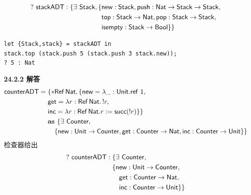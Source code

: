 \begin{taplauthorsolutionentrybox}
\[\begin{aligned}
?\ \mathsf{stackADT}:\{\exists\ \mathsf{Stack},
\{&\mathsf{new}:\mathsf{Stack},
\mathsf{push}:\mathsf{Nat}\to\mathsf{Stack}\to\mathsf{Stack},\\
&\mathsf{top}:\mathsf{Stack}\to\mathsf{Nat},
\mathsf{pop}:\mathsf{Stack}\to\mathsf{Stack},\\
&\mathsf{isempty}:\mathsf{Stack}\to\mathsf{Bool}\}\}
\end{aligned}
\]
\begin{lstlisting}
let {Stack,stack} = stackADT in
stack.top (stack.push 5 (stack.push 3 stack.new));
? 5 : Nat
\end{lstlisting}
\end{taplauthorsolutionentrybox}

\begin{taplauthorsolutionentrybox}
\label{sol:author:24.2.2}
\textbf{24.2.2 解答}
\[
\begin{aligned}
\mathsf{counterADT}={}&
\{*\mathsf{Ref}\,\mathsf{Nat},
\{\mathsf{new}=\lambda\_:\mathsf{Unit}.\mathsf{ref}\ 1,\\
&\mathsf{get}=\lambda r:\mathsf{Ref}\,\mathsf{Nat}.\,!r,\\
&\mathsf{inc}=\lambda r:\mathsf{Ref}\,\mathsf{Nat}.
  r:=\mathsf{succ}(!r)\}\}\\
&\textbf{as }\{\exists\ \mathsf{Counter},\\
&\quad\{\mathsf{new}:\mathsf{Unit}\to\mathsf{Counter},
\mathsf{get}:\mathsf{Counter}\to\mathsf{Nat},
\mathsf{inc}:\mathsf{Counter}\to\mathsf{Unit}\}\}
\end{aligned}
\]
检查器给出
\[
\begin{aligned}
?\ \mathsf{counterADT}:{}&
\{\exists\ \mathsf{Counter},\\
&\{\mathsf{new}:\mathsf{Unit}\to\mathsf{Counter},\\
&\quad\mathsf{get}:\mathsf{Counter}\to\mathsf{Nat},\\
&\quad\mathsf{inc}:\mathsf{Counter}\to\mathsf{Unit}\}\}
\end{aligned}
\]
\end{taplauthorsolutionentrybox}

